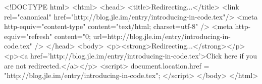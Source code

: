 <!DOCTYPE html>
<html>
<head>
<title>Redirecting...</title>
<link rel="canonical" href="http://blog.jle.im/entry/introducing-in-code.tex"/>
<meta http-equiv="content-type" content="text/html; charset=utf-8" />
<meta http-equiv="refresh" content="0; url=http://blog.jle.im/entry/introducing-in-code.tex" />
</head>
<body>
  <p><strong>Redirecting...</strong></p>
  <p><a href='http://blog.jle.im/entry/introducing-in-code.tex'>Click here if you are not redirected.</a></p>
  <script>
    document.location.href = "http://blog.jle.im/entry/introducing-in-code.tex";
  </script>
</body>
</html>
